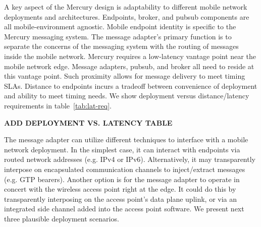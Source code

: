 A key aspect of the Mercury design is adaptability to different mobile
network deployments and architectures. Endpoints, broker, and pubsub
components are all mobile-environment agnostic. Mobile endpoint
identity is specific to the Mercury messaging system. The message
adapter's primary function is to separate the concerns of the
messaging system with the routing of messages inside the mobile
network.  Mercury requires a low-latency vantage point near the mobile
network edge. Message adapters, pubsub, and broker all need to reside
at this vantage point.  Such proximity allows for message delivery to
meet timing SLAs.  Distance to endpoints incurs a tradeoff between
convenience of deployment and ability to meet timing needs. We show
deployment versus distance/latency requirements in
table~\ref{tab:lat-req}.

{\bf ADD DEPLOYMENT VS. LATENCY TABLE}

The message adapter can utilize different techniques to interface with
a mobile network deployment. In the simplest case, it can interact
with endpoints via routed network addresses (e.g. IPv4 or
IPv6). Alternatively, it may transparently interpose on encapsulated
communication channels to inject/extract messages (e.g. GTP
bearers). Another option is for the message adapter to operate in
concert with the wireless access point right at the edge. It could do
this by transparently interposing on the access point's data plane
uplink, or via an integrated side channel added into the access point
software.  We present next three plausible deployment scenarios.

